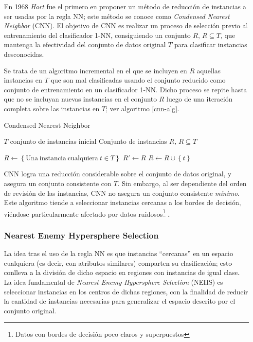 En 1968 \emph{Hart} \cite{Hart:2006:CNN:2263267.2267647} fue el primero en proponer un método de reducción de instancias a ser usadas por la regla NN; este método se conoce como \emph{Condensed Nearest Neighbor} (CNN). El objetivo de CNN es realizar un proceso de selección previo al entrenamiento del clasificador 1-NN, consiguiendo un conjunto $R$, $R \subseteq T$, que mantenga la efectividad del conjunto de datos original $T$ para clasificar instancias desconocidas.

Se trata de un algoritmo incremental en el que se incluyen en $R$ aquellas instancias en $T$ que son mal clasificadas usando el conjunto reducido como conjunto de entrenamiento en un clasificador 1-NN. Dicho proceso se repite hasta que no se incluyan nuevas instancias en el conjunto $R$ luego de una iteración completa sobre las instancias en $T$; ver algoritmo \ref{cnn-alg}.

\begin{algorithm}
\caption{Condensed Nearest Neighbor}
\label{cnn-alg}
\begin{algorithmic}[1]

\Require $T$ conjunto de instancias inicial
\Ensure Conjunto de instancias $R$, $R \subseteq T$

\State $R \gets \left\lbrace \mathrm{Una\ instancia\ cualquiera}\ t \in T \right\rbrace$
\Repeat
	\State $R' \gets R$
			\State $R \gets R \cup \left\lbrace t \right\rbrace$
		\EndIf
	\EndFor
{}
\State {}
\end{algorithmic}
\end{algorithm}

CNN logra una reducción considerable sobre el conjunto de datos original, y asegura un conjunto consistente con $T$. Sin embargo, al ser dependiente del orden de revisión de las instancias, CNN no asegura un conjunto consistente \emph{mínimo}. Este algoritmo tiende a seleccionar instancias cercanas a los bordes de decisión, viéndose particularmente afectado por datos ruidosos\footnote{Datos con bordes de decisión poco claros y superpuestos} \cite{amal2011survey, Jankowski_comparisonof}.

\subsubsection{Nearest Enemy Hypersphere Selection}

La idea tras el uso de la regla NN es que instancias ``cercanas'' en un espacio cualquiera (es decir, con atributos similares) comparten su clasificación; esto conlleva a la división de dicho espacio en regiones con instancias de igual clase. La idea fundamental de \emph{Nearest Enemy Hypersphere Selection} (NEHS) es seleccionar instancias en los centros de dichas regiones, con la finalidad de reducir la cantidad de instancias necesarias para generalizar el espacio descrito por el conjunto original.

